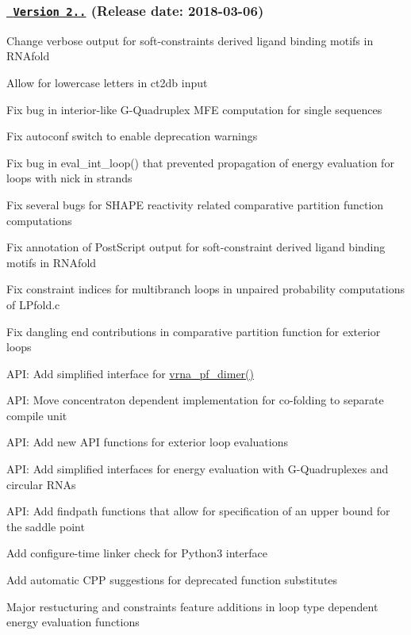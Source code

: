 \subsubsection*{\href{https://github.com/ViennaRNA/ViennaRNA/compare/v2.4.3...v2.4.4}{\texttt{ Version 2..}} (Release date\+: 2018-\/03-\/06)}


\begin{DoxyItemize}
\item Change verbose output for soft-\/constraints derived ligand binding motifs in R\+N\+Afold
\item Allow for lowercase letters in ct2db input
\item Fix bug in interior-\/like G-\/\+Quadruplex M\+FE computation for single sequences
\item Fix autoconf switch to enable deprecation warnings
\item Fix bug in eval\+\_\+int\+\_\+loop() that prevented propagation of energy evaluation for loops with nick in strands
\item Fix several bugs for S\+H\+A\+PE reactivity related comparative partition function computations
\item Fix annotation of Post\+Script output for soft-\/constraint derived ligand binding motifs in R\+N\+Afold
\item Fix constraint indices for multibranch loops in unpaired probability computations of L\+Pfold.\+c
\item Fix dangling end contributions in comparative partition function for exterior loops
\item A\+PI\+: Add simplified interface for \mbox{\hyperlink{group__part__func__global_ga4e5c7d06c302a7c59fc0d64dc142ca63}{vrna\+\_\+pf\+\_\+dimer()}}
\item A\+PI\+: Move concentraton dependent implementation for co-\/folding to separate compile unit
\item A\+PI\+: Add new A\+PI functions for exterior loop evaluations
\item A\+PI\+: Add simplified interfaces for energy evaluation with G-\/\+Quadruplexes and circular R\+N\+As
\item A\+PI\+: Add findpath functions that allow for specification of an upper bound for the saddle point
\item Add configure-\/time linker check for Python3 interface
\item Add automatic C\+PP suggestions for deprecated function substitutes
\item Major restucturing and constraints feature additions in loop type dependent energy evaluation functions

\end{DoxyItemize}
